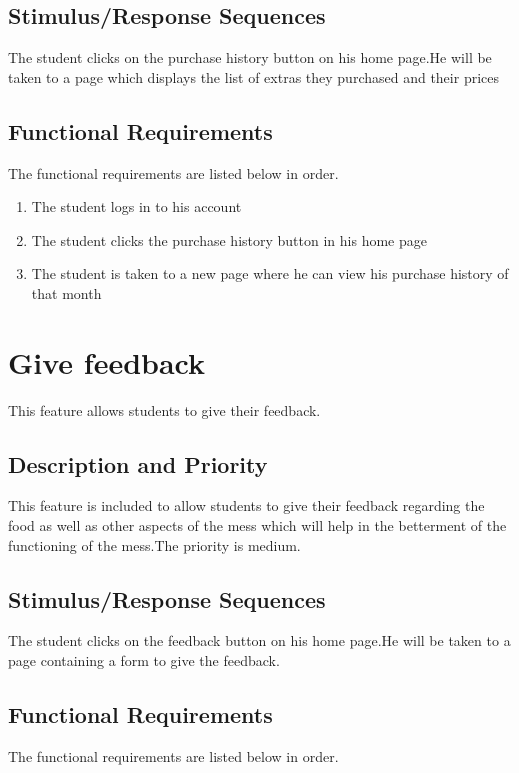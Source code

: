 \documentclass{scrreprt}
\begin{document}
\subsection{Stimulus/Response Sequences}
The student clicks on the purchase history button on his home page.He will be taken to a page which displays the list of extras they purchased and their prices
\subsection{Functional Requirements}
The functional requirements are listed below in order.

\begin{enumerate}
    \item The student logs in to his account 
    \item The student clicks the purchase history button in his home page
    \item The student is taken to a new page where he can view his purchase history of that month
    
\end{enumerate} 

\section{Give feedback}
This feature allows students to give their feedback.

\subsection{Description and Priority}
This feature is included to allow students to give their feedback regarding the food as well as other aspects of the mess which will help in the betterment of the functioning of the mess.The priority is medium.

\subsection{Stimulus/Response Sequences}
The student clicks on the feedback button on his home page.He will be taken to a page containing a form to give the feedback.
\subsection{Functional Requirements}
The functional requirements are listed below in order.
\end{document}
